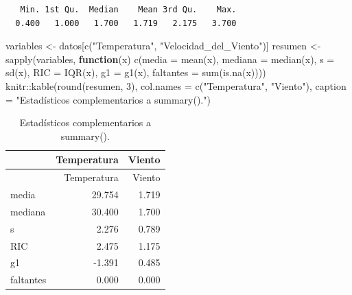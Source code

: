 \documentclass[oneside, openany, fontset=libertinus]{mitthesis}
\newenvironment{Shaded}{\begin{snugshade}}{\end{snugshade}}
\newcommand{\AttributeTok}[1]{\textcolor[rgb]{0.40,0.45,0.13}{#1}}
\newcommand{\ControlFlowTok}[1]{\textcolor[rgb]{0.00,0.23,0.31}{\textbf{#1}}}
\newcommand{\DecValTok}[1]{\textcolor[rgb]{0.68,0.00,0.00}{#1}}
\newcommand{\FunctionTok}[1]{\textcolor[rgb]{0.28,0.35,0.67}{#1}}
\newcommand{\NormalTok}[1]{\textcolor[rgb]{0.00,0.23,0.31}{#1}}
\newcommand{\OtherTok}[1]{\textcolor[rgb]{0.00,0.23,0.31}{#1}}
\newcommand{\SpecialCharTok}[1]{\textcolor[rgb]{0.37,0.37,0.37}{#1}}
\newcommand{\StringTok}[1]{\textcolor[rgb]{0.13,0.47,0.30}{#1}}
\begin{document}
\begin{Shaded}
\end{Shaded}

\begin{verbatim}
   Min. 1st Qu.  Median    Mean 3rd Qu.    Max. 
  0.400   1.000   1.700   1.719   2.175   3.700 
\end{verbatim}

\begin{Shaded}
\begin{Highlighting}[]
\NormalTok{variables }\OtherTok{\textless{}{-}}\NormalTok{ datos[}\FunctionTok{c}\NormalTok{(}\StringTok{"Temperatura"}\NormalTok{, }\StringTok{"Velocidad\_del\_Viento"}\NormalTok{)]}
\NormalTok{resumen }\OtherTok{\textless{}{-}} \FunctionTok{sapply}\NormalTok{(variables, }\ControlFlowTok{function}\NormalTok{(x)}
  \FunctionTok{c}\NormalTok{(}\AttributeTok{media =} \FunctionTok{mean}\NormalTok{(x), }\AttributeTok{mediana =} \FunctionTok{median}\NormalTok{(x), }\AttributeTok{s =} \FunctionTok{sd}\NormalTok{(x), }\AttributeTok{RIC =} \FunctionTok{IQR}\NormalTok{(x),}
    \AttributeTok{g1 =} \FunctionTok{g1}\NormalTok{(x), }\AttributeTok{faltantes =} \FunctionTok{sum}\NormalTok{(}\FunctionTok{is.na}\NormalTok{(x))))}
\NormalTok{knitr}\SpecialCharTok{::}\FunctionTok{kable}\NormalTok{(}\FunctionTok{round}\NormalTok{(resumen, }\DecValTok{3}\NormalTok{),}
             \AttributeTok{col.names =} \FunctionTok{c}\NormalTok{(}\StringTok{"Temperatura"}\NormalTok{, }\StringTok{"Viento"}\NormalTok{),}
             \AttributeTok{caption =} \StringTok{"Estadísticos complementarios a summary()."}\NormalTok{)}
\end{Highlighting}
\end{Shaded}

\begin{longtable}[]{@{}lrr@{}}
\caption{Estadísticos complementarios a summary().}\tabularnewline
\toprule\noalign{}
& Temperatura & Viento \\
\midrule\noalign{}
\endfirsthead
\toprule\noalign{}
& Temperatura & Viento \\
\midrule\noalign{}
\endhead
\bottomrule\noalign{}
\endlastfoot
media & 29.754 & 1.719 \\
mediana & 30.400 & 1.700 \\
s & 2.276 & 0.789 \\
RIC & 2.475 & 1.175 \\
g1 & -1.391 & 0.485 \\
faltantes & 0.000 & 0.000 \\
\end{longtable}
\end{document}
